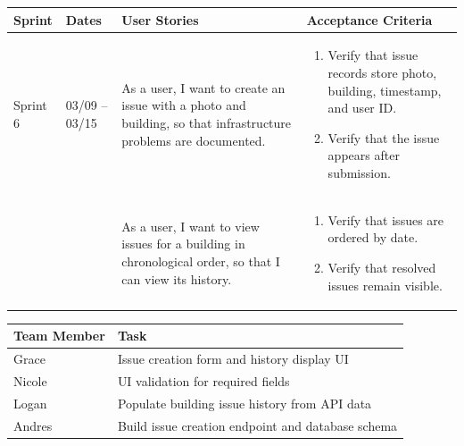 \documentclass[11pt]{article}
\begin{document}
\vspace{0.5em}

\noindent
\begin{tabular}{|L{1.2cm}|L{1.8cm}|L{5.2cm}|L{6.3cm}|}
\hline
\textbf{Sprint} & \textbf{Dates} & \textbf{User Stories} & \textbf{Acceptance Criteria} \\
\hline
Sprint 6 & 03/09 -- 03/15 &
As a user, I want to create an issue with a photo and building, so that infrastructure problems are documented. &
\begin{enumerate}
    \item Verify that issue records store photo, building, timestamp, and user ID.
    \item Verify that the issue appears after submission.
\end{enumerate} \\
& &
As a user, I want to view issues for a building in chronological order, so that I can view its history. &
\begin{enumerate}
    \item Verify that issues are ordered by date.
    \item Verify that resolved issues remain visible.
\end{enumerate} \\
\hline
\end{tabular}

\vspace{0.5em}

\noindent
\begin{tabular}{|L{2.5cm}|L{12.5cm}|}
\hline
\textbf{Team Member} & \textbf{Task} \\
\hline
Grace & Issue creation form and history display UI \\
\hline
Nicole & UI validation for required fields \\
\hline
Logan & Populate building issue history from API data \\
\hline
Andres & Build issue creation endpoint and database schema \\
\hline
\end{tabular}

\vspace{2em}


\vspace{0.5em}
\end{document}
